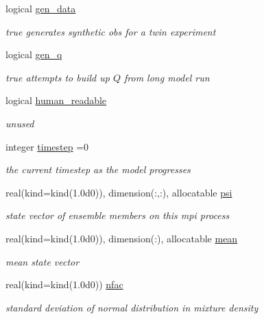 \begin{DoxyCompactItemize}
logical \hyperlink{structpf__control_1_1pf__control__type_a250ef33de2e01234ed341b9864338b7d}{gen\-\_\-data}
\begin{DoxyCompactList}\small\item\em true generates synthetic obs for a twin experiment \end{DoxyCompactList}\item 
logical \hyperlink{structpf__control_1_1pf__control__type_ae1e2616b063090ccd403e0f1c7820fce}{gen\-\_\-q}
\begin{DoxyCompactList}\small\item\em true attempts to build up $Q$ from long model run \end{DoxyCompactList}\item 
logical \hyperlink{structpf__control_1_1pf__control__type_a8b7974924f8883cc71d3fd7d3ef66a9b}{human\-\_\-readable}
\begin{DoxyCompactList}\small\item\em unused \end{DoxyCompactList}\item 
integer \hyperlink{structpf__control_1_1pf__control__type_a12beb826016805c71fcc112a733f2330}{timestep} =0
\begin{DoxyCompactList}\small\item\em the current timestep as the model progresses \end{DoxyCompactList}\item 
real(kind=kind(1.\-0d0)), dimension(\-:,\-:), allocatable \hyperlink{structpf__control_1_1pf__control__type_a3e5d92f215b032c3a563de43278c937f}{psi}
\begin{DoxyCompactList}\small\item\em state vector of ensemble members on this mpi process \end{DoxyCompactList}\item 
real(kind=kind(1.\-0d0)), dimension(\-:), allocatable \hyperlink{structpf__control_1_1pf__control__type_a90ea6d211c5b4d70ab99e12e9a8dc8d5}{mean}
\begin{DoxyCompactList}\small\item\em mean state vector \end{DoxyCompactList}\item 
real(kind=kind(1.\-0d0)) \hyperlink{structpf__control_1_1pf__control__type_a77aec7df0491895c8300476fb856b80a}{nfac}
\begin{DoxyCompactList}\small\item\em standard deviation of normal distribution in mixture density \end{DoxyCompactList}\item 

\end{DoxyCompactItemize}
